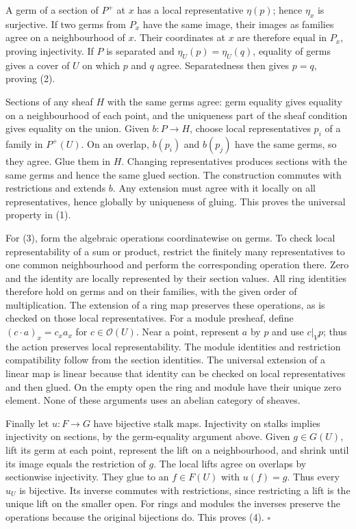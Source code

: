 \documentclass[
  english,
  11pt,
  a4paper,
]{article}
\begin{document}
A germ of a section of \(P^+\) at \(x\) has a local representative
\(\eta(p)\); hence \(\eta_x\) is surjective. If two germs from \(P_x\)
have the same image, their images as families agree on a neighbourhood
of \(x\). Their coordinates at \(x\) are therefore equal in \(P_x\),
proving injectivity. If \(P\) is separated and \(\eta_U(p)=\eta_U(q)\),
equality of germs gives a cover of \(U\) on which \(p\) and \(q\) agree.
Separatedness then gives \(p=q\), proving (2).

Sections of any sheaf \(H\) with the same germs agree: germ equality
gives equality on a neighbourhood of each point, and the uniqueness part
of the sheaf condition gives equality on the union. Given \(b:P\to H\),
choose local representatives \(p_i\) of a family in \(P^+(U)\). On an
overlap, \(b(p_i)\) and \(b(p_j)\) have the same germs, so they agree.
Glue them in \(H\). Changing representatives produces sections with the
same germs and hence the same glued section. The construction commutes
with restrictions and extends \(b\). Any extension must agree with it
locally on all representatives, hence globally by uniqueness of gluing.
This proves the universal property in (1).

For (3), form the algebraic operations coordinatewise on germs. To check
local representability of a sum or product, restrict the finitely many
representatives to one common neighbourhood and perform the
corresponding operation there. Zero and the identity are locally
represented by their section values. All ring identities therefore hold
on germs and on their families, with the given order of multiplication.
The extension of a ring map preserves these operations, as is checked on
those local representatives. For a module presheaf, define
\((c\cdot a)_x=c_xa_x\) for \(c\in\mathcal O(U)\). Near a point,
represent \(a\) by \(p\) and use \(c|_V p\); thus the action preserves
local representability. The module identities and restriction
compatibility follow from the section identities. The universal
extension of a linear map is linear because that identity can be checked
on local representatives and then glued. On the empty open the ring and
module have their unique zero element. None of these arguments uses an
abelian category of sheaves.

Finally let \(u:F\to G\) have bijective stalk maps. Injectivity on
stalks implies injectivity on sections, by the germ-equality argument
above. Given \(g\in G(U)\), lift its germ at each point, represent the
lift on a neighbourhood, and shrink until its image equals the
restriction of \(g\). The local lifts agree on overlaps by sectionwise
injectivity. They glue to an \(f\in F(U)\) with \(u(f)=g\). Thus every
\(u_U\) is bijective. Its inverse commutes with restrictions, since
restricting a lift is the unique lift on the smaller open. For rings and
modules the inverses preserve the operations because the original
bijections do. This proves (4). \(\square\)
\end{document}

